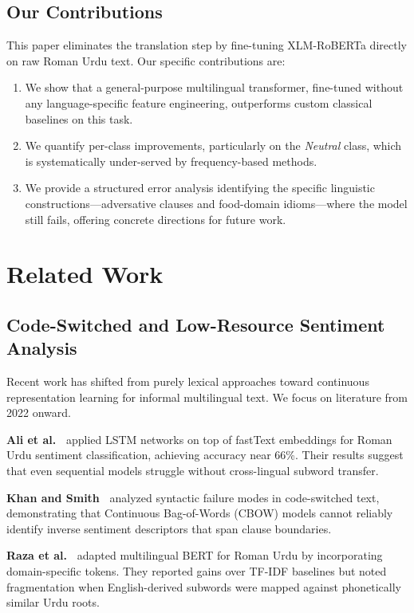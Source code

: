 \documentclass[conference]{IEEEtran}
\begin{document}
\subsection{Our Contributions}
This paper eliminates the translation step by fine-tuning XLM-RoBERTa directly on raw Roman Urdu text. Our specific contributions are:
\begin{enumerate}
    \item We show that a general-purpose multilingual transformer, fine-tuned without any language-specific feature engineering, outperforms custom classical baselines on this task.
    \item We quantify per-class improvements, particularly on the \textit{Neutral} class, which is systematically under-served by frequency-based methods.
    \item We provide a structured error analysis identifying the specific linguistic constructions---adversative clauses and food-domain idioms---where the model still fails, offering concrete directions for future work.
\end{enumerate}

\section{Related Work}

\subsection{Code-Switched and Low-Resource Sentiment Analysis}
Recent work has shifted from purely lexical approaches toward continuous representation learning for informal multilingual text. We focus on literature from 2022 onward.

\textbf{Ali et al.~\cite{ref1}} applied LSTM networks on top of fastText embeddings for Roman Urdu sentiment classification, achieving accuracy near 66\%. Their results suggest that even sequential models struggle without cross-lingual subword transfer.

\textbf{Khan and Smith~\cite{ref2}} analyzed syntactic failure modes in code-switched text, demonstrating that Continuous Bag-of-Words (CBOW) models cannot reliably identify inverse sentiment descriptors that span clause boundaries.

\textbf{Raza et al.~\cite{ref3}} adapted multilingual BERT for Roman Urdu by incorporating domain-specific tokens. They reported gains over TF-IDF baselines but noted fragmentation when English-derived subwords were mapped against phonetically similar Urdu roots.
\end{document}
